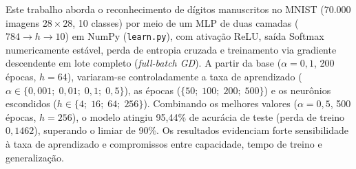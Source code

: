 Este trabalho aborda o reconhecimento de dígitos manuscritos no MNIST (70.000 imagens $28 \times 28$, 10 classes) por meio de um MLP de duas camadas ($784 \to h \to 10$) em NumPy (\texttt{learn.py}), com ativação ReLU, saída Softmax numericamente estável, perda de entropia cruzada e treinamento via gradiente descendente em lote completo (\emph{full-batch GD}). A partir da base ($\alpha = 0{,}1$, 200 épocas, $h = 64$), variaram-se controladamente a taxa de aprendizado ($\alpha \in \{0{,}001;\; 0{,}01;\; 0{,}1;\; 0{,}5\}$), as épocas ($\{50;\; 100;\; 200;\; 500\}$) e os neurônios escondidos ($h \in \{4;\; 16;\; 64;\; 256\}$). Combinando os melhores valores ($\alpha = 0{,}5$, 500 épocas, $h = 256$), o modelo atingiu 95,44\% de acurácia de teste (perda de treino $0{,}1462$), superando o limiar de 90\%. Os resultados evidenciam forte sensibilidade à taxa de aprendizado e compromissos entre capacidade, tempo de treino e generalização.
